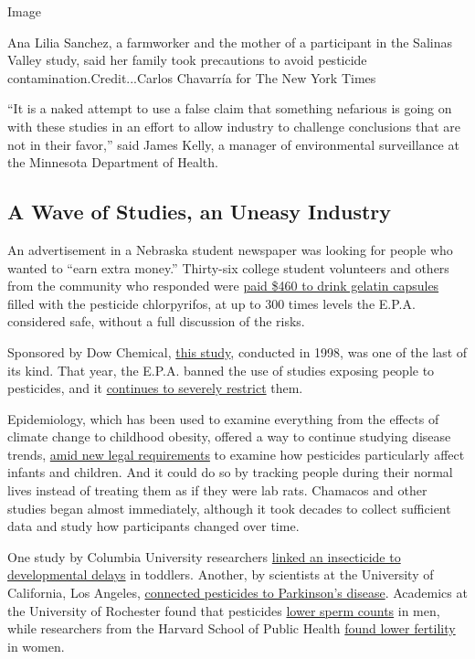 Image

Ana Lilia Sanchez, a farmworker and the mother of a participant in the
Salinas Valley study, said her family took precautions to avoid
pesticide contamination.Credit...Carlos Chavarría for The New York Times

``It is a naked attempt to use a false claim that something nefarious is
going on with these studies in an effort to allow industry to challenge
conclusions that are not in their favor,'' said James Kelly, a manager
of environmental surveillance at the Minnesota Department of Health.

\hypertarget{a-wave-of-studies-an-uneasy-industry}{%
\subsection{A Wave of Studies, an Uneasy
Industry}\label{a-wave-of-studies-an-uneasy-industry}}

An advertisement in a Nebraska student newspaper was looking for people
who wanted to ``earn extra money.'' Thirty-six college student
volunteers and others from the community who responded were
\href{https://www.documentcloud.org/documents/4641196-Human-Studies-of-Pesticides.html}{paid
\$460 to drink gelatin capsules} filled with the pesticide chlorpyrifos,
at up to 300 times levels the E.P.A. considered safe, without a full
discussion of the risks.

Sponsored by Dow Chemical,
\href{https://www.documentcloud.org/documents/4639889-1999-Human-Tests-Chlorpyfios-Kisicki.html}{this
study}, conducted in 1998, was one of the last of its kind. That year,
the E.P.A. banned the use of studies exposing people to pesticides, and
it
\href{https://www.regulations.gov/document?D=EPA-HQ-OPP-2010-0785-0037}{continues
to severely restrict} them.

Epidemiology, which has been used to examine everything from the effects
of climate change to childhood obesity, offered a way to continue
studying disease trends,
\href{https://archive.epa.gov/pesticides/regulating/laws/fqpa/web/html/fqpahigh.html}{amid
new legal requirements} to examine how pesticides particularly affect
infants and children. And it could do so by tracking people during their
normal lives instead of treating them as if they were lab rats. Chamacos
and other studies began almost immediately, although it took decades to
collect sufficient data and study how participants changed over time.

One study by Columbia University researchers
\href{https://www.ncbi.nlm.nih.gov/pubmed/17116700}{linked an
insecticide to developmental delays} in toddlers. Another, by scientists
at the University of California, Los Angeles,
\href{https://www.niehs.nih.gov/research/supported/success/ritz/index.cfm}{connected
pesticides to Parkinson's disease}. Academics at the University of
Rochester found that pesticides
\href{https://onlinelibrary.wiley.com/doi/abs/10.1111/j.1365-2605.2005.00620.x}{lower
sperm counts} in men, while researchers from the Harvard School of
Public Health
\href{https://jamanetwork.com/journals/jamainternalmedicine/article-abstract/2659557?redirect=true}{found
lower fertility} in women.

